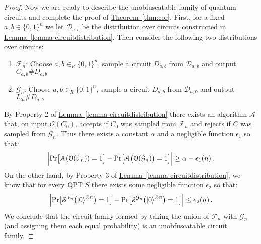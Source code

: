 \documentclass[11pt]{article}
\numberwithin{equation}{section}
\newcommand{\expref}[2]{\texorpdfstring{\hyperref[#2]{#1~\ref{#2}}}{#1~\ref{#2}}}
\newcommand{\algo}{\mathcal}
\newcommand{\Enc}{\ensuremath{\mathsf{Enc}}\xspace}
\newcommand{\Homorcl}{\ensuremath{\mathsf{Hom}}\xspace}
\newcommand{\inrand}{\in_R}
\begin{document}
{\begin{proof}

Now we are ready to describe the unobfuscatable family of quantum circuits and complete the proof of \expref{Theorem}{thm:cor}. First, for a fixed $a,b \in \{0, 1\}^n$ we let $\mathcal{D}_{a,b}$ be the distribution over circuits constructed in \expref{Lemma}{lemma-circuitdistribution}. Then consider the following two distributions over circuits: 
\begin{enumerate}
\item $\mathcal{F}_{n}$: Choose $a,b \inrand \{0,1\}^n$,  sample a circuit $D_{a, b}$ from $\mathcal{D}_{a,b}$ and output $C_{a,b}\# D_{a,b}$ 
\item $\mathcal{G}_{n}$: Choose $a,b \inrand \{0,1\}^n$,  sample a circuit $D_{a, b}$ from $\mathcal{D}_{a,b}$ and output $I_{2n}\# D_{a,b}$
\end{enumerate}
By Property 2 of \expref{Lemma}{lemma-circuitdistribution} there exists an algorithm $\algo{A}$ that, on input $\mathcal{O}(C_0)$, accepts if $C_0$ was sampled from $\algo{F}_n$ and rejects if $C$ was sampled from $\algo{G}_n$.  Thus there exists a constant $\alpha$ and a negligible function $\epsilon_1$ so that:
$$
\Bigl| \text{Pr}\bigl[\mathcal A(\mathcal{O}(\mathcal{F}_n)) = 1\bigr]
- \text{Pr}\bigl[\mathcal A\bigl(\mathcal{O}(\mathcal{G}_n)\bigr) = 1\bigr] \Bigr| 
\geq \alpha-\epsilon_1(n)\,.
$$
On the other hand, by Property 3 of \expref{Lemma}{lemma-circuitdistribution}, we know that for every QPT $S$ there exists some negligible function $\epsilon_2$ so that: 
$$
\Bigl| \text{Pr}\bigl[\mathcal S^{\mathcal{F}_n}\bigl({\left\vert{0}\right\rangle}^{\otimes n}\bigr) = 1\bigr]
- \text{Pr}\bigl[\mathcal S^{\mathcal{G}_n}\bigl({\left\vert{0}\right\rangle}^{\otimes n}\bigr) = 1\bigr] \Bigr| 
\leq \epsilon_2(n)\,.
$$
We conclude that the circuit family formed by taking the union of $\mathcal F_n$ with $\mathcal G_n$ (and assigning them each equal probability) is an unobfuscatable circuit family.
\end{proof}

}
\end{document}
